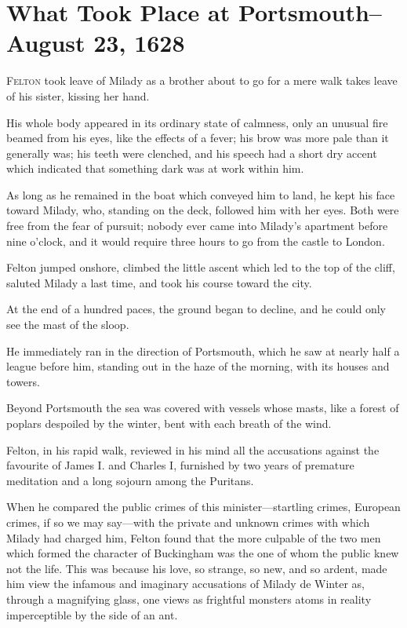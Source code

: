 
\chapter{What Took Place at Portsmouth--August 23, 1628}

\lettrine[]{F}{elton} took leave of Milady as a brother about to go for a mere walk takes leave of his sister, kissing her hand. 

\zz
His whole body appeared in its ordinary state of calmness, only an unusual fire beamed from his eyes, like the effects of a fever; his brow was more pale than it generally was; his teeth were clenched, and his speech had a short dry accent which indicated that something dark was at work within him. 

As long as he remained in the boat which conveyed him to land, he kept his face toward Milady, who, standing on the deck, followed him with her eyes. Both were free from the fear of pursuit; nobody ever came into Milady's apartment before nine o'clock, and it would require three hours to go from the castle to London. 

Felton jumped onshore, climbed the little ascent which led to the top of the cliff, saluted Milady a last time, and took his course toward the city. 

At the end of a hundred paces, the ground began to decline, and he could only see the mast of the sloop. 

He immediately ran in the direction of Portsmouth, which he saw at nearly half a league before him, standing out in the haze of the morning, with its houses and towers. 

Beyond Portsmouth the sea was covered with vessels whose masts, like a forest of poplars despoiled by the winter, bent with each breath of the wind. 

Felton, in his rapid walk, reviewed in his mind all the accusations against the favourite of James I. and Charles I, furnished by two years of premature meditation and a long sojourn among the Puritans. 

When he compared the public crimes of this minister---startling crimes, European crimes, if so we may say---with the private and unknown crimes with which Milady had charged him, Felton found that the more culpable of the two men which formed the character of Buckingham was the one of whom the public knew not the life. This was because his love, so strange, so new, and so ardent, made him view the infamous and imaginary accusations of Milady de Winter as, through a magnifying glass, one views as frightful monsters atoms in reality imperceptible by the side of an ant. 

